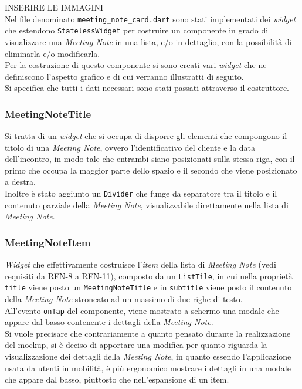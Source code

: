 INSERIRE LE IMMAGINI \\

Nel file denominato \lstinline{meeting_note_card.dart} sono stati implementati dei \emph{widget} che estendono \lstinline{StatelessWidget} per costruire un componente in grado di visualizzare una \emph{Meeting Note} in una lista, e/o in dettaglio, con la possibilità di eliminarla e/o modificarla. \\
Per la costruzione di questo componente si sono creati vari \emph{widget} che ne definiscono l'aspetto grafico e di cui verranno illustratti di seguito.\\
Si specifica che tutti i dati necessari sono stati passati attraverso il costruttore.

\subsubsection*{MeetingNoteTitle}
\label{subsubsec:meeting-note-title}

Si tratta di un \emph{widget} che si occupa di disporre gli elementi che compongono il titolo di una 
\emph{Meeting Note}, ovvero l'identificativo del cliente e la data dell'incontro, in modo tale che entrambi siano posizionati sulla stessa riga, con il primo che occupa la maggior parte dello spazio e il secondo che viene posizionato a destra.\\
Inoltre è stato aggiunto un \lstinline{Divider}\cite{site:divider} che funge da separatore tra il titolo e il contenuto parziale della \emph{Meeting Note}, visualizzabile direttamente nella lista di \emph{Meeting Note}.

\subsubsection*{MeetingNoteItem}
\label{subsubsec:meeting-note-item}

\emph{Widget} che effettivamente costruisce l'\emph{item} della lista di \emph{Meeting Note} (vedi requisiti da \hyperref[RFN-8]{RFN-8} a \hyperref[RFN-11]{RFN-11}), composto da un \lstinline{ListTile}\cite{site:list-tile}, in cui nella proprietà \lstinline{title} viene posto un \lstinline{MeetingNoteTitle} e in \lstinline{subtitle} viene posto il contenuto della \emph{Meeting Note} stroncato ad un massimo di due righe di testo.\\
All'evento \lstinline{onTap} del componente, viene mostrato a schermo una modale che appare dal basso contenente i dettagli della \emph{Meeting Note}.\\
Si vuole precisare che contrariamente a quanto pensato durante la realizzazione del \gls{mockup}\glsoccur, si è deciso di apportare una modifica per quanto riguarda la visualizzazione dei dettagli della \emph{Meeting Note}, in quanto essendo l'applicazione usata da utenti in mobilità, è più ergonomico mostrare i dettagli in una modale che appare dal basso, piuttosto che nell'espansione di un item.

